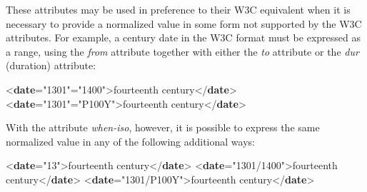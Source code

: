  These attributes may be used in preference to their W3C equivalent when it is necessary to provide a normalized value in some form not supported by the W3C attributes. For example, a century date in the W3C format must be expressed as a range, using the {\itshape from} attribute together with either the {\itshape to} attribute or the {\itshape dur} (duration) attribute: \par\bgroup{}\exampleFont \begin{shaded}\noindent\mbox{}{<\textbf{date}\hspace*{1em}{from}="{1301}"\hspace*{1em}{to}="{1400}">}fourteenth century{</\textbf{date}>}\mbox{}\newline 
{<\textbf{date}\hspace*{1em}{from}="{1301}"\hspace*{1em}{dur}="{P100Y}">}fourteenth century{</\textbf{date}>}\end{shaded}\egroup\par \noindent  With the attribute {\itshape when-iso}, however, it is possible to express the same normalized value in any of the following additional ways: \par\bgroup{}\exampleFont \begin{shaded}\noindent\mbox{}{<\textbf{date}\hspace*{1em}{when-iso}="{13}">}fourteenth\mbox{}\newline 
 century{</\textbf{date}>}\mbox{}\newline 
{<\textbf{date}\hspace*{1em}{when-iso}="{1301/1400}">}fourteenth century{</\textbf{date}>}\mbox{}\newline 
{<\textbf{date}\hspace*{1em}{when-iso}="{1301/P100Y}">}fourteenth century{</\textbf{date}>}\end{shaded}\egroup\par 
